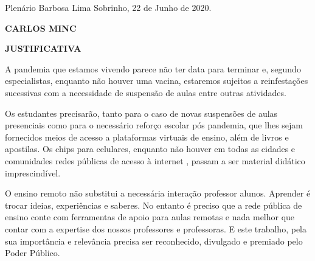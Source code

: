 \documentclass[10pt]{article}
\begin{document}
\begin{center}
  Plenário Barbosa Lima Sobrinho, 22 de Junho de 2020.

   \bigskip

  \textbf{ CARLOS MINC}

  \bigskip

  \textbf{JUSTIFICATIVA}
  \bigskip

\end{center}

  A pandemia que estamos vivendo parece não ter data para terminar e, segundo especialistas, enquanto não houver uma vacina, estaremos sujeitos a reinfestações sucessivas com a necessidade de suspensão de aulas entre outras atividades. 

Os estudantes precisarão, tanto para o caso de novas suspensões de aulas presenciais como para o necessário reforço escolar pós pandemia, que lhes sejam fornecidos meios de acesso a plataformas virtuais de ensino, além de livros e apostilas. Os chips para celulares, enquanto não houver em todas as cidades e comunidades redes públicas de acesso à internet , passam a ser  material didático imprescindível.

O ensino remoto não substitui a necessária interação professor alunos. Aprender é trocar ideias, experiências e saberes. No entanto é preciso que a rede pública de ensino conte com ferramentas de apoio para aulas remotas e nada melhor que contar com a expertise dos nossos professores e professoras. E este trabalho, pela sua importância e relevância precisa ser reconhecido, divulgado e premiado pelo Poder Público.
  



\iffalse
\begin{center}
  \textbf{REFERÊNCIAS}
\end{center}


\fi
\end{document}

